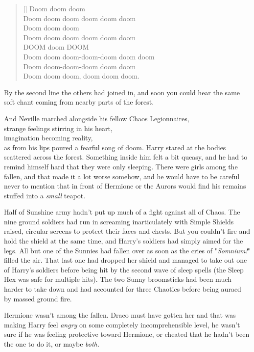 \SmallVSpace
\settowidth{\versewidth}{Doom doom doom-doom-doom doom doom}
\begin{verse}[\versewidth]
Doom doom doom\\
Doom doom doom doom doom doom\\
Doom doom doom\\
Doom doom doom doom doom doom\\
DOOM doom DOOM\\
Doom doom doom-doom-doom doom doom\\
Doom doom-doom-doom doom doom\\
Doom doom doom, doom doom doom.
\end{verse}
\SmallVSpace

By the second line the others had joined in, and soon you could hear the same
soft chant coming from nearby parts of the forest.

\SomeVSpace
\noindent
And Neville marched alongside his fellow Chaos Legionnaires,\\
strange feelings stirring in his heart,\\
imagination becoming reality,\\
as from his lips poured a fearful song of doom.
\sbreak
Harry stared at the bodies scattered across the forest. Something inside him
felt a bit queasy, and he had to remind himself hard that they were only
sleeping. There were girls among the fallen, and that made it a lot worse
somehow, and he would have to be careful never to mention that in front of
Hermione or the Aurors would find his remains stuffed into a \emph{small}
teapot.

Half of Sunshine army hadn't put up much of a fight against all of Chaos. The
nine ground soldiers had run in screaming inarticulately with Simple Shields
raised, circular screens to protect their faces and chests. But you couldn't
fire and hold the shield at the same time, and Harry's soldiers had simply
aimed for the legs. All but one of the Sunnies had fallen over as soon as the
cries of "\emph{Somnium!}" filled the air. That last one had dropped her shield
and managed to take out one of Harry's soldiers before being hit by the second
wave of sleep spells (the Sleep Hex was safe for multiple hits). The two Sunny
broomsticks had been much harder to take down and had accounted for three
Chaotics before being auraed by massed ground fire.

Hermione wasn't among the fallen. Draco must have gotten her and that was
making Harry feel \emph{angry} on some completely incomprehensible level, he
wasn't sure if he was feeling protective toward Hermione, or cheated that he
hadn't been the one to do it, or maybe \emph{both.}

